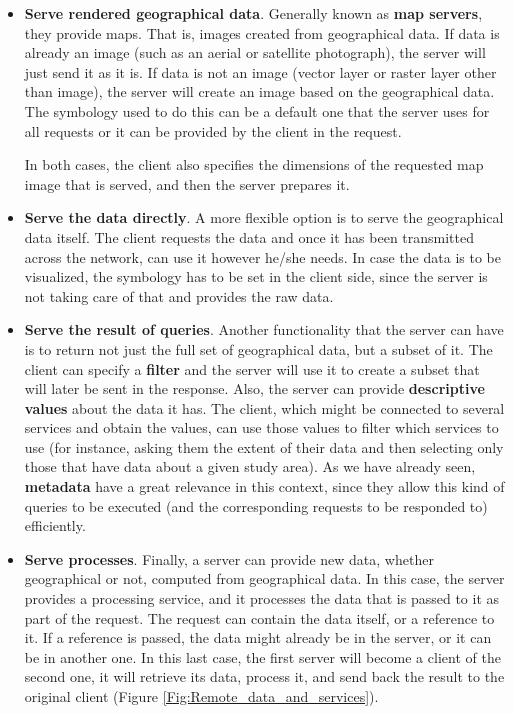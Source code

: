 \begin{itemize}
\item \textbf{Serve rendered geographical data}. Generally known as \textbf{map servers}, they provide maps. That is, images created from geographical data. If data is already an image (such as an aerial or satellite photograph), the server will just send it as it is. If data is not an image (vector layer or raster layer other than image), the server will create an image based on the geographical data. The symbology used to do this can be a default one that the server uses for all requests or it can be provided by the client in the request. 

In both cases, the client also specifies the dimensions of the requested map image that is served, and then the server prepares it.


\item \textbf{Serve the data directly}. A more flexible option is to serve the geographical data itself. The client requests the data and once it has been transmitted across the network, can use it however he/she needs. In case the data is to be visualized, the symbology has to be set in the client side, since the server is not taking care of that and provides the raw data.


\item \textbf{Serve the result of queries}. Another functionality that the server can have is to return not just the full set of geographical data, but a subset of it. The client can specify a \textbf{filter} and the server will use it to create a subset that will later be sent in the response. Also, the server can provide \textbf{descriptive values} about the data it has. The client, which might be connected to several services and obtain the values, can use those values to filter which services to use (for instance, asking them the extent of their data and then selecting only those that have data about a given study area). As we have already seen, \textbf{metadata} have a great relevance in this context, since they allow this kind of queries to be executed (and the corresponding requests to be responded to) efficiently.

\item \textbf{Serve processes}. Finally, a server can provide new data, whether geographical or not, computed from geographical data. In this case, the server provides a processing service, and it processes the data that is passed to it as part of the request. The request can contain the data itself, or a reference to it. If a reference is passed, the data might already be in the server, or it can be in another one. In this last case, the first server will become a client of the second one, it will retrieve its data, process it, and send back the result to the original client (Figure \ref{Fig:Remote_data_and_services}).



\end{itemize}
